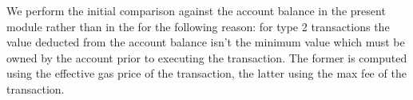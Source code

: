\saNote{} We perform the initial comparison against the account balance in the present module rather than in the \hubMod{} for the following reason: for type 2 transactions the value deducted from the account balance isn't the minimum value which must be owned by the account prior to executing the transaction. The former is computed using the effective gas price of the transaction, the latter using the max fee of the transaction. 
